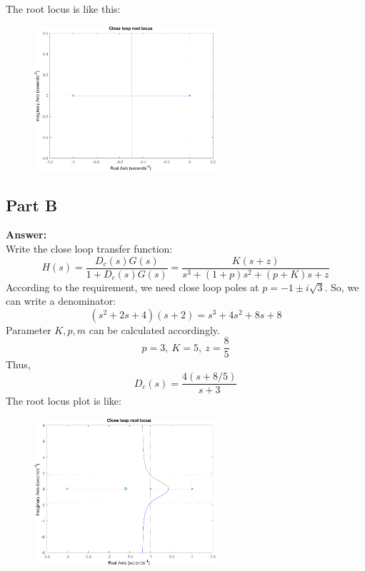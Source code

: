 \documentclass[a4paper]{article}
\begin{document}
\noindent The root locus is like this:
\begin{figure}[H]
\centering
\includegraphics[width = 0.6\textwidth]{pic/t4.png}
\end{figure}
\subsection{Part B}
{\bf Answer:}\\
Write the close loop transfer function:
$$
H(s) = \frac{D_c(s)G(s)}{1+D_c(s)G(s)} = \frac{K(s+z)}{s^3+(1+p)s^2+(p+K)s+z}
$$
According to the requirement, we need close loop poles at $p = -1\pm i\sqrt{3}$. So, we can write a denominator:
$$
(s^2 + 2s + 4)(s+2) = s^3 + 4s^2 + 8s + 8
$$
Parameter $K,p,m$ can be calculated accordingly.
$$
p = 3, \ K = 5,\ z = \frac85
$$
Thus, 
$$
D_c(s) = \frac{4(s+8/5)}{s+3}
$$
The root locus plot is like:
\begin{figure}[H]
\centering
\includegraphics[width = 0.6\textwidth]{pic/t5.png}
\end{figure}
\end{document}
